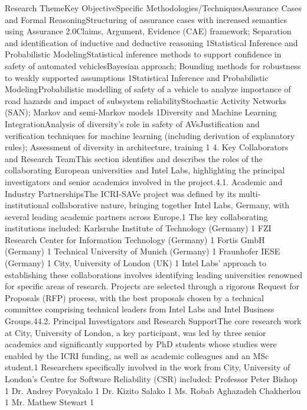 Research ThemeKey ObjectiveSpecific Methodologies/TechniquesAssurance Cases and Formal ReasoningStructuring of assurance cases with increased semantics using Assurance 2.0Claims, Argument, Evidence (CAE) framework; Separation and identification of inductive and deductive reasoning 1Statistical Inference and Probabilistic ModelingStatistical inference methods to support confidence in safety of automated vehiclesBayesian approach; Bounding methods for robustness to weakly supported assumptions 1Statistical Inference and Probabilistic ModelingProbabilistic modelling of safety of a vehicle to analyze importance of road hazards and impact of subsystem reliabilityStochastic Activity Networks (SAN); Markov and semi-Markov models 1Diversity and Machine Learning IntegrationAnalysis of diversity's role in safety of AVsJustification and verification techniques for machine learning (including derivation of explanatory rules); Assessment of diversity in architecture, training 1
4. Key Collaborators and Research TeamThis section identifies and describes the roles of the collaborating European universities and Intel Labs, highlighting the principal investigators and senior academics involved in the project.4.1. Academic and Industry PartnershipsThe ICRI-SAVe project was defined by its multi-institutional collaborative nature, bringing together Intel Labs, Germany, with several leading academic partners across Europe.1 The key collaborating institutions included:
Karlsruhe Institute of Technology (Germany) 1
FZI Research Center for Information Technology (Germany) 1
Fortis GmbH (Germany) 1
Technical University of Munich (Germany) 1
Fraunhofer IESE (Germany) 1
City, University of London (UK) 1
Intel Labs' approach to establishing these collaborations involves identifying leading universities renowned for specific areas of research. Projects are selected through a rigorous Request for Proposals (RFP) process, with the best proposals chosen by a technical committee comprising technical leaders from Intel Labs and Intel Business Groups.44.2. Principal Investigators and Research SupportThe core research work at City, University of London, a key participant, was led by three senior academics and significantly supported by PhD students whose studies were enabled by the ICRI funding, as well as academic colleagues and an MSc student.1 Researchers specifically involved in the work from City, University of London's Centre for Software Reliability (CSR) included:
Professor Peter Bishop 1
Dr. Andrey Povyakalo 1
Dr. Kizito Salako 1
Ms. Robab Aghazadeh Chakherlou 1
Mr. Mathew Stewart 1

